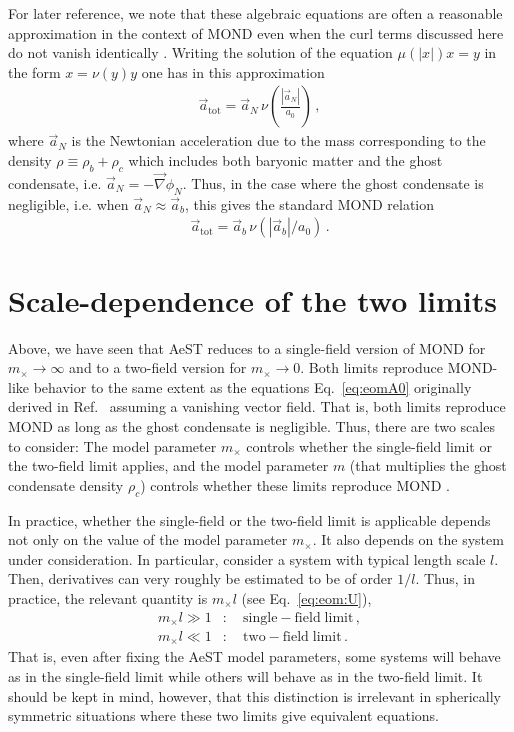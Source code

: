 \documentclass[reprint, amsmath,amssymb, nofootinbib, aps, prd]{revtex4-2}
\begin{document}
For later reference, we note that these algebraic equations are often a reasonable approximation in the context of MOND even when the curl terms discussed here do not vanish identically \citep{Famaey2012}.
Writing the solution of the equation $\mu(|x|) x = y$ in the form $x = \nu(y) y$ one has in this approximation
\begin{align}
 \vec{a}_{\mathrm{tot}} = \vec{a}_N \, \nu\left(\frac{|\vec{a}_N|}{a_0}\right) \,,
\end{align}
where $\vec{a}_N$ is the Newtonian acceleration due to the mass corresponding to the density $\rho \equiv \rho_b + \rho_c$ which includes both baryonic matter and the ghost condensate, i.e. $\vec{a}_N = - \vec{\nabla} \phi_N$.
Thus, in the case where the ghost condensate is negligible, i.e. when $\vec{a}_N \approx \vec{a}_b$, this gives the standard MOND relation
\begin{align}
 \label{eq:algebraic}
  \vec{a}_{\mathrm{tot}} = \vec{a}_b \, \nu(|\vec{a}_b|/a_0) \,.
\end{align}



\section{Scale-dependence of the two limits}
\label{sec:scale}

Above, we have seen that AeST reduces to a single-field version of MOND for $m_\times \to \infty$ and to a two-field version for $m_\times \to 0$.
Both limits reproduce MOND-like behavior to the same extent as the equations Eq.~\eqref{eq:eomA0} originally derived in Ref.~\cite{Skordis2020} assuming a vanishing vector field.
That is, both limits reproduce MOND as long as the ghost condensate is negligible.
Thus, there are two scales to consider:
The model parameter $m_\times$ controls whether the single-field limit or the two-field limit applies, and the model parameter $m$ (that multiplies the ghost condensate density $\rho_c$) controls whether these limits reproduce MOND \citep{Skordis2020,Mistele2023,Verwayen2023}.

In practice, whether the single-field or the two-field limit is applicable depends not only on the value of the model parameter $m_\times$.
It also depends on the system under consideration.
In particular, consider a system with typical length scale $l$.
Then, derivatives can very roughly be estimated to be of order $1/l$.
Thus, in practice, the relevant quantity is $m_\times l$ (see Eq.~\eqref{eq:eom:U}),
\begin{align}
 m_\times l \gg 1&: \quad \mathrm{single-field\;limit} \,, \\
 m_\times l \ll 1&: \quad \mathrm{two-field\;limit} \,.
\end{align}
That is, even after fixing the AeST model parameters, some systems will behave as in the single-field limit while others will behave as in the two-field limit.
It should be kept in mind, however, that this distinction is irrelevant in spherically symmetric situations where these two limits give equivalent equations.
\end{document}
